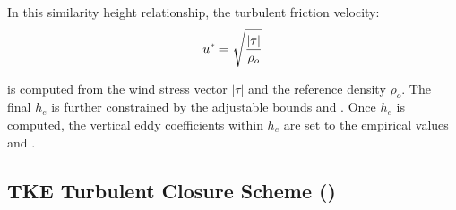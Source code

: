 In this similarity height relationship, the turbulent friction velocity:
\begin{equation}
         u^{*} = \sqrt \frac {|\tau|} {\rho_o}  	\\
\end{equation}

is computed from the wind stress vector $|\tau|$ and the reference density $ \rho_o$.
The final $h_{e}$ is further constrained by the adjustable bounds  and .
Once $h_{e}$ is computed, the vertical eddy coefficients within $h_{e}$ are set to 
the empirical values  and  \citep{Lermusiaux2001}.

\subsection{TKE Turbulent Closure Scheme ()}
\label{ZDF_tke}


